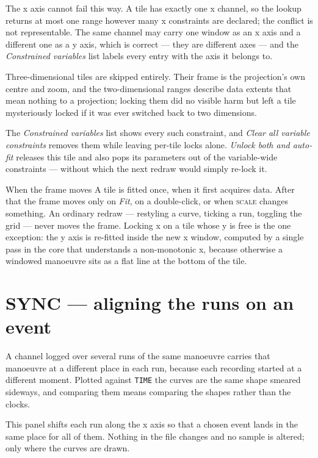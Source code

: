 \documentclass[11pt,a4paper,oneside]{report}
\newcommand{\code}[1]{\texttt{#1}}
\newcommand{\tab}[1]{\textsc{#1}}
\begin{document}
The x axis cannot fail this way. A tile has exactly one x channel, so the lookup
returns at most one range however many x constraints are declared; the conflict
is not representable. The same channel may carry one window as an x axis and a
different one as a y axis, which is correct --- they are different axes --- and
the \emph{Constrained variables} list labels every entry with the axis it belongs
to.

Three-dimensional tiles are skipped entirely. Their frame is the projection's own
centre and zoom, and the two-dimensional ranges describe data extents that mean
nothing to a projection; locking them did no visible harm but left a tile
mysteriously locked if it was ever switched back to two dimensions.

The \emph{Constrained variables} list shows every such constraint, and \emph{Clear
all variable constraints} removes them while leaving per-tile locks alone.
\emph{Unlock both and auto-fit} releases this tile and also pops its parameters
out of the variable-wide constraints --- without which the next redraw would
simply re-lock it.

\begin{aoenote}{When the frame moves}
A tile is fitted once, when it first acquires data. After that the frame moves
only on \emph{Fit}, on a double-click, or when \tab{scale} changes something. An
ordinary redraw --- restyling a curve, ticking a run, toggling the grid --- never
moves the frame. Locking x on a tile whose y is free is the one exception: the y
axis is re-fitted inside the new x window, computed by a single pass in the core
that understands a non-monotonic x, because otherwise a windowed manoeuvre sits
as a flat line at the bottom of the tile.
\end{aoenote}

\section{SYNC --- aligning the runs on an event}
\label{sec:sync}


A channel logged over several runs of the same manoeuvre carries that manoeuvre
at a different place in each run, because each recording started at a different
moment. Plotted against \code{TIME} the curves are the same shape smeared
sideways, and comparing them means comparing the shapes rather than the clocks.

This panel shifts each run along the x axis so that a chosen event lands in the
same place for all of them. Nothing in the file changes and no sample is
altered; only where the curves are drawn.
\end{document}
